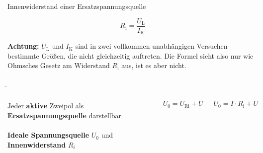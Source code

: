 \begin{frame}
{		\begin{Merksatz}{Innenwiderstand einer Ersatzspannungsquelle}{}

			\begin{equation*}
				R_\mathrm{i} = \frac{U_\mathrm{L}}{I_\mathrm{K}}
			\end{equation*}

		\end{Merksatz}

		\textbf{Achtung:} $U_\mathrm{L}$ und $I_\mathrm{K}$ sind in zwei vollkommen unabhängigen Versuchen bestimmte Größen,
		die nicht gleichzeitig auftreten. Die Formel sieht also nur wie Ohmsches Gesetz am Widerstand $R_\mathrm{i}$ aus,
		ist es aber nicht.




	}





	\b{

		\begin{columns}


			Jeder \textbf{aktive} Zweipol als \textbf{Ersatzspannungsquelle} darstellbar\\

			\phantom{text}\\

			\textbf{Ideale Spannungsquelle} $U_0$ und
			\textbf{Innenwiderstand} $R_i$

			\begin{equation*}
				U_0 = U_\mathrm{Ri} + U
			\end{equation*}

			\begin{equation*}
				U_0 =I \cdot R_\mathrm{i} + U
			\end{equation*}




\end{columns}}
\end{frame}
